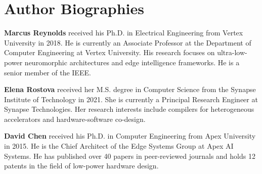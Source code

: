 \section*{Author Biographies}
\label{sec:biographies}

\noindent\textbf{Marcus Reynolds} received his Ph.D. in Electrical Engineering from Vertex University in 2018. He is currently an Associate Professor at the Department of Computer Engineering at Vertex University. His research focuses on ultra-low-power neuromorphic architectures and edge intelligence frameworks. He is a senior member of the IEEE.

\vspace{0.4cm}
\noindent\textbf{Elena Rostova} received her M.S. degree in Computer Science from the Synapse Institute of Technology in 2021. She is currently a Principal Research Engineer at Synapse Technologies. Her research interests include compilers for heterogeneous accelerators and hardware-software co-design.

\vspace{0.4cm}
\noindent\textbf{David Chen} received his Ph.D. in Computer Engineering from Apex University in 2015. He is the Chief Architect of the Edge Systems Group at Apex AI Systems. He has published over 40 papers in peer-reviewed journals and holds 12 patents in the field of low-power hardware design.
